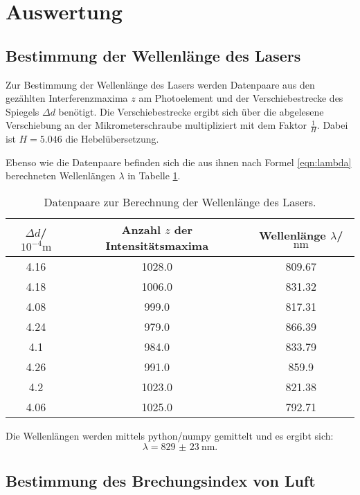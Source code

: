 \section{Auswertung}
\label{sec:Auswertung}
\subsection{Bestimmung der Wellenlänge des Lasers}
Zur Bestimmung der Wellenlänge des Lasers werden Datenpaare aus den gezählten Interferenzmaxima $z$ am Photoelement und der Verschiebestrecke des Spiegels $\Delta d$ benötigt.
Die Verschiebestrecke ergibt sich über die abgelesene Verschiebung an der Mikrometerschraube multipliziert mit dem Faktor $\frac{1}{H}$.
Dabei ist $H=5.046$ die Hebelübersetzung.

Ebenso wie die Datenpaare befinden sich die aus ihnen nach Formel \eqref{eqn:lambda} berechneten Wellenlängen $\lambda $ in Tabelle \ref{tab:spieglein}.
\begin{table}
  \caption{Datenpaare zur Berechnung der Wellenlänge des Lasers.}
  \label{tab:spieglein}
  \centering
\begin{tabular}{ccc}
  \toprule
$\Delta d$/$10^{-4}\si{\meter}$ & Anzahl $z$ der Intensitätsmaxima & Wellenlänge $\lambda$/$\si{\nano\meter}$ \\
\midrule
4.16 & 1028.0 & 809.67 \\
4.18 & 1006.0 & 831.32 \\
4.08 & 999.0 & 817.31 \\
4.24 & 979.0 & 866.39 \\
4.1 & 984.0 & 833.79 \\
4.26 & 991.0 & 859.9 \\
4.2 & 1023.0 & 821.38 \\
4.06 & 1025.0 & 792.71 \\
\bottomrule
\end{tabular}
\end{table}


Die Wellenlängen werden mittels python/numpy \cite{numpy} gemittelt und es ergibt sich:
\begin{equation}
\lambda=  \SI{829(23)}{\nano\meter} \text{.}
\end{equation}

\FloatBarrier

\subsection{Bestimmung des Brechungsindex von Luft}

